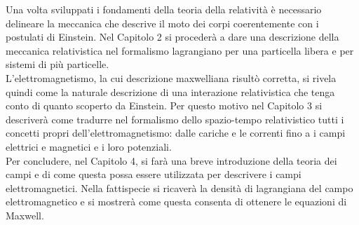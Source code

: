 Una volta sviluppati i fondamenti della teoria della relatività è necessario delineare la meccanica che descrive il moto dei corpi coerentemente con i postulati di Einstein. Nel Capitolo 2 si procederà a dare una descrizione della meccanica relativistica nel formalismo lagrangiano per una particella libera e per sistemi di più particelle.\\

L'elettromagnetismo, la cui descrizione maxwelliana risultò corretta, si rivela quindi come la naturale descrizione di una interazione relativistica che tenga conto di quanto scoperto da Einstein. Per questo motivo nel Capitolo 3 si descriverà come tradurre nel formalismo dello spazio-tempo relativistico tutti i concetti propri dell'elettromagnetismo: dalle cariche e le correnti fino a i campi elettrici e magnetici e i loro potenziali.\\

Per concludere, nel Capitolo 4, si farà una breve introduzione della teoria dei campi e di come questa possa essere utilizzata per descrivere i campi elettromagnetici. Nella fattispecie si ricaverà la densità di lagrangiana del campo elettromagnetico e si mostrerà come questa consenta di ottenere le equazioni di Maxwell.